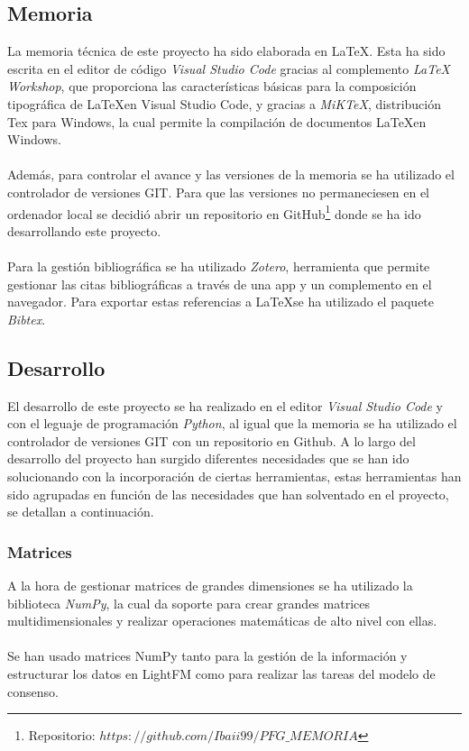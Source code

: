 \subsection{Memoria}
La memoria técnica de este proyecto ha sido elaborada en \LaTeX. Esta ha sido escrita en el editor de código \textit{Visual Studio Code} gracias al complemento \textit{LaTeX Workshop}, que proporciona las características básicas para la composición tipográfica de \LaTeX en Visual Studio Code, y gracias a \textit{MiKTeX}, distribución Tex para Windows, la cual permite la compilación de documentos \LaTeX en Windows.
\\ \\
Además, para controlar el avance y las versiones de la memoria se ha utilizado el controlador de versiones GIT. Para que las versiones no permaneciesen en el ordenador local se decidió abrir un repositorio en GitHub\footnote{Repositorio: $https://github.com/Ibaii99/PFG\_MEMORIA$} donde se ha ido desarrollando este proyecto.
\\ \\
Para la gestión bibliográfica se ha utilizado \textit{Zotero}, herramienta que permite gestionar las citas bibliográficas a través de una app y un complemento en el navegador. Para exportar estas referencias a \LaTeX se ha utilizado el paquete \textit{Bibtex}.
\subsection{Desarrollo}
El desarrollo de este proyecto se ha realizado en el editor \textit{Visual Studio Code} y con el leguaje de programación \textit{Python}, al igual que la memoria se ha utilizado el controlador de versiones GIT con un repositorio en Github. A lo largo del desarrollo del proyecto han surgido diferentes necesidades que se han ido solucionando con la incorporación de ciertas herramientas, estas herramientas han sido agrupadas en función de las necesidades que han solventado en el proyecto, se detallan a continuación.
\subsubsection{Matrices}
A la hora de gestionar matrices de grandes dimensiones se ha utilizado la biblioteca \textit{NumPy}, la cual da soporte para crear grandes matrices multidimensionales y realizar operaciones matemáticas de alto nivel con ellas. 
\\ \\
Se han usado matrices NumPy tanto para la gestión de la información y estructurar los datos en LightFM como para realizar las tareas del modelo de consenso.
